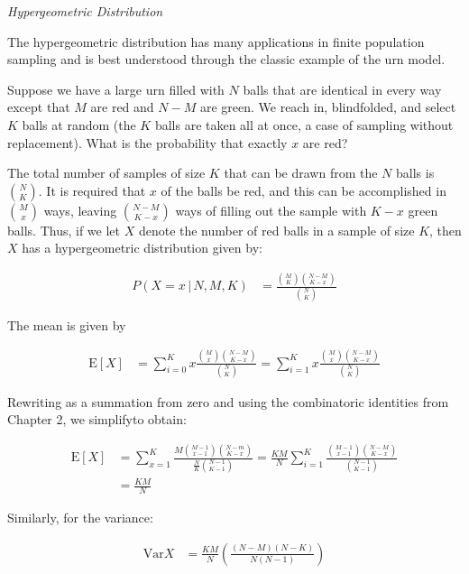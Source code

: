 \documentclass[11pt,a4paper]{report}
\theoremstyle{definition} \newtheorem{defn}{Definition}[section]
\theoremstyle{theorem} \newtheorem{thm}{Theorem}[section]
\theoremstyle{example} \newtheorem{ex}{Example}[section]
\begin{document}
\textit{Hypergeometric Distribution}

The hypergeometric distribution has many applications in finite
population sampling and is best understood through the classic example
of the urn model.

Suppose we have a large urn filled with $N$ balls that are identical
in every way except that $M$ are red and $N-M$ are green.  We reach
in, blindfolded, and select $K$ balls at random (the $K$ balls are
taken all at once, a case of sampling without replacement).  What is
the probability that exactly $x$ are red?

The total number of samples of size $K$ that can be drawn from the $N$
balls is ${N \choose K}$.  It is required that $x$ of the balls be
red, and this can be accomplished in ${M \choose x}$ ways, leaving
${N-M \choose K-x}$ ways of filling out the sample with $K-x$ green
balls.  Thus, if we let $X$ denote the number of red balls in a sample
of size $K$, then $X$ has a hypergeometric distribution given by:

\begin{align*} P(X = x \, | \, N, M, K) &= \frac{{M \choose K} {N-M
\choose K-x}}{{N \choose K}}
\end{align*}

The mean is given by

\begin{align*} \mathrm{E} \left[ X \right] &= \sum_{i=0}^K x \frac{{M
\choose x} {N-M \choose K-x}}{{N \choose K}} = \sum_{i=1}^K x \frac{{M
\choose x} {N-M \choose K-x}}{{N \choose K}}
\end{align*}

Rewriting as a summation from zero and using the combinatoric
identities from Chapter 2, we simplifyto obtain:

\begin{align*} \mathrm{E} \left[ X \right] &= \sum_{x=1}^K \frac{M
{M-1 \choose x-1}{N-m \choose K-x}}{\frac{N}{K}{N-1 \choose K-1}} =
\frac{KM}{N} \sum_{i=1}^K \frac{{M-1 \choose x-1}{N-M \choose
K-x}}{{N-1 \choose K-1}} \\ &= \frac{KM}{N}
\end{align*}

Similarly, for the variance:

\begin{align*} \mathrm{Var} X &= \frac{KM}{N} \left(
\frac{(N-M)(N-K)}{N(N-1)} \right)
\end{align*}
\end{document}
